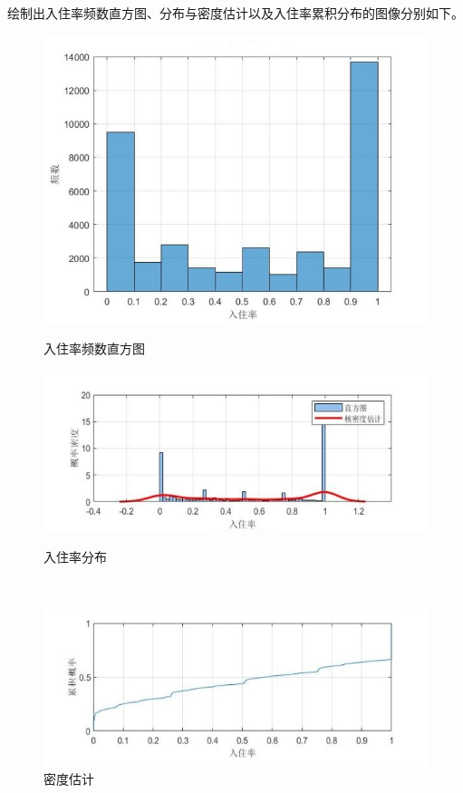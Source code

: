 \documentclass[12pt]{article}
\begin{document}
\begin{CJK}{UTF8}{gbsn}
	绘制出入住率频数直方图、分布与密度估计以及入住率累积分布的图像分别如下。
	
	
	\begin{figure}[htp]
		\centering
		\begin{minipage}[b]{0.5\textwidth}
			\centering
			\includegraphics[width=1\linewidth]{pic/5.jpg}
			\caption{入住率频数直方图}
		\end{minipage}%
		\hfill
		\begin{minipage}[b]{0.5\textwidth}
			\centering
			\begin{minipage}[b]{\textwidth}
				\centering
				\includegraphics[width=0.8\linewidth]{pic/61.jpg}
				\caption{入住率分布}
			\end{minipage}\\[10pt]
			\begin{minipage}[b]{\textwidth}
				\centering
				\includegraphics[width=0.8\linewidth]{pic/62.jpg}
				\caption{密度估计}
			\end{minipage}
		\end{minipage}
	\end{figure}
	

\end{CJK}
\end{document}

